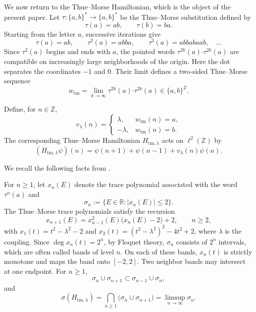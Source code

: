 \documentclass{amsart}
\theoremstyle{definition}
\begin{document}
We now return to the Thue--Morse Hamiltonian, which is the object of
the present paper. 
Let $\tau:\{a,b\}^{*}\longrightarrow\{a,b\}^{*}$
be the Thue--Morse substitution defined by
\[
    \tau(a)=ab,
    \qquad
    \tau(b)=ba.
\]
Starting from the letter \(a\), successive iterations give
\[
    \tau(a)=ab,\qquad
    \tau^{2}(a)=abba,\qquad
    \tau^{3}(a)=abbabaab,\quad\ldots
\]
Since \(\tau^{2}(a)\) begins and ends with \(a\), the pointed words
$ \tau^{2k}(a)\boldsymbol{\cdot}\tau^{2k}(a)$
are compatible on increasingly large neighborhoods of the origin.
Here the dot separates the coordinates \(-1\) and \(0\). Their limit
defines a two-sided Thue--Morse sequence
\[
    w_{\mathrm{tm}}
    =
    \lim_{k\to\infty}
    \tau^{2k}(a)\boldsymbol{\cdot}\tau^{2k}(a)
    \in\{a,b\}^{\mathbb Z}.
\]

Define, for $n\in\mathbb{Z}$,           
\[
    v_{\lambda}(n)
    =
    \begin{cases}
        \lambda, & w_{\mathrm{tm}}(n)=a,\\
        -\lambda, & w_{\mathrm{tm}}(n)=b.
    \end{cases}
\]
The corresponding Thue--Morse Hamiltonian
\(H_{\mathrm{tm},\lambda}\) acts on \(\ell^{2}(\mathbb Z)\) by
\[
    (H_{\mathrm{tm},\lambda}\psi)(n)
    =
    \psi(n+1)+\psi(n-1)+v_{\lambda}(n)\psi(n).
\]

We recall the following facts from \cite{LQ15}.

For \(n\geq1\), let \(x_n(E)\) denote the trace polynomial associated
with the word \(\tau^n(a)\) and 
\[
    \sigma_n
    :=
    \{E\in\mathbb R:|x_n(E)|\leq2\}.
\]
The Thue--Morse trace polynomials satisfy
the recursion
\begin{equation}
    x_{n+1}(E)
    =
    x_{n-1}^{2}(E)\bigl(x_n(E)-2\bigr)+2,
    \qquad n\geq2,
    \label{eq:TM-trace-recursion}
\end{equation}
with $x_1(t)=t^2-\lambda^2-2$ and $x_2(t)=(t^2-\lambda^2)^2-4t^2+2$,
where $\lambda$ is the coupling.
Since $\deg x_n(t)=2^n$, by Floquet theory, $\sigma_n$ consists of $2^n$ intervals,
which are often called bands of level $n$.
On each of these bands, $x_n(t)$ is strictly monotone and maps the band onto $[-2,2]$.
Two neighbor bands may intersect at one endpoint.
For $n\ge1$, 
$$\sigma_n\cup\sigma_{n+1} \subset  \sigma_{n-1}\cup\sigma_n,$$ 
and
\begin{equation}
    \sigma(H_{\mathrm{tm},\lambda})
    =
    \bigcap_{n\geq1}
    \bigl(\sigma_n\cup\sigma_{n+1}\bigr)=\limsup_{n\to\infty}\sigma_n.
    \label{eq:TM-periodic-approximation}
\end{equation}
\end{document}
